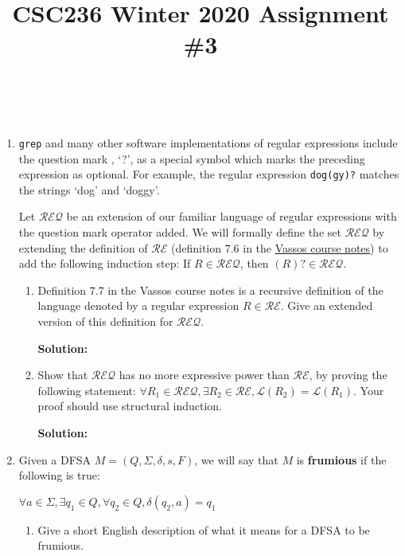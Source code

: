 \documentclass[boldsans]{article}
\title{CSC236 Winter 2020 Assignment \#3}
\author{\name \\ \textit{\utorid}}
\newenvironment{solution}
{\bigskip \noindent \textbf{Solution: \\}}
{}
\newcommand{\RE}{\mathcal{RE}}
\newcommand{\REQ}{\mathcal{REQ}}
\renewcommand{\L}{\mathcal{L}}
\begin{document}
\maketitle

\begin{enumerate}

\item \texttt{grep} and many other software implementations of regular expressions include the question mark , `?', as a special symbol which marks the preceding expression as optional. For example, the regular expression \texttt{dog(gy)?} matches the strings `dog' and `doggy'.

Let $\REQ$ be an extension of our familiar language of regular expressions with the question mark operator added. We will formally define the set $\REQ$ by extending the definition of $\RE$ (definition 7.6 in the \href{http://www.cs.toronto.edu/~vassos/b36-notes/notes.pdf}{Vassos course notes}) to add the following induction step: If $R \in \REQ$, then $(R)? \in \REQ$.

\begin{enumerate}
    \item Definition 7.7 in the Vassos course notes is a recursive definition of the language denoted by a regular expression $R \in \RE$. Give an extended version of this definition for $\REQ$.
    
    \begin{solution}
    
    \end{solution}
    
    \item Show that $\REQ$ has no more expressive power than $\RE$, by proving the following statement: $\forall R_1 \in \REQ, \exists R_2 \in \RE, \L(R_2) = \L(R_1)$. Your proof should use structural induction.
    
    \begin{solution}

    \end{solution}
\end{enumerate}

\newpage
\item Given a DFSA $M = (Q, \Sigma, \delta, s, F)$, we will say that $M$ is \textbf{frumious} if the following is true:

$\forall a \in \Sigma, \exists q_1 \in Q, \forall q_2 \in Q, \delta(q_2, a) = q_1$

\begin{enumerate}
    \item Give a short English description of what it means for a DFSA to be frumious.
    

\end{enumerate}
\end{enumerate}
\end{document}
